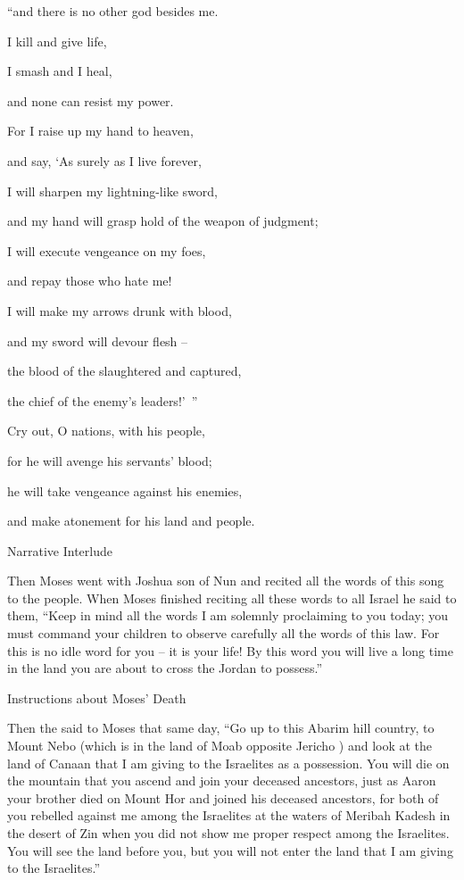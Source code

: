 {\par }{\Q “and there is no
other god
besides
me.
\par }{\Q I
kill
and give life,
\par }{\Q I smash
and I
heal,
\par }{\Q and none
can resist
my power.
\par }{\Q {}For
I raise
up my hand
to
heaven,
\par }{\Q and say,
‘As surely
as I
live forever,
\par }{\Q {}I will sharpen
my lightning-like
sword,
\par }{\Q and my hand
will grasp hold
of the weapon of judgment;
\par }{\Q I will execute
vengeance
on my foes,
\par }{\Q and repay
those who hate me!
\par }{\Q {}I will make my arrows
drunk
with blood,
\par }{\Q and my sword
will devour
flesh
–
\par }{\Q the blood
of the slaughtered
and captured,
\par }{\Q the chief
of the enemy’s
leaders!’ ”
\par }{\Q {}Cry
out, O nations,
with his people,
\par }{\Q for
he will avenge
his servants’
blood;
\par }{\Q he will take
vengeance
against his enemies,
\par }{\Q and make atonement
for his land
and people.
\par }{\SH Narrative Interlude
\par }{\PP {}Then Moses
went
with Joshua
son
of Nun
and recited
all
the words
of this
song
to the people.
When Moses
finished
reciting
all
these
words
to all
Israel
he said
to
them, “Keep
in mind
all
the words
I am
solemnly
proclaiming to you today;
you must
command
your children
to observe
carefully
all
the words
of this
law.
For
this is no
idle
word
for
you – it is your life! By this word you will live a long time in the land you are about to cross the Jordan to possess.”
\par }{\SH Instructions about Moses’ Death
\par }{\PP {}Then
the {}
said
to
Moses
that same
day,
“Go up
to
this
Abarim
hill country,
to Mount
Nebo
(which
is in the land
of Moab
opposite
Jericho
) and look
at the
land
of Canaan
that
I am
giving
to the Israelites
as a possession.
You will die
on the mountain
that
you
ascend
and join
your deceased ancestors,
just
as Aaron
your brother
died
on Mount
Hor
and joined
his deceased ancestors,
for both
of you rebelled
against me among
the Israelites
at the waters
of Meribah
Kadesh
in the desert
of Zin
when you did not
show me proper respect
among
the Israelites.
You will see
the land
before
you, but you will not
enter
the land
that
I am
giving
to the Israelites.”

}
